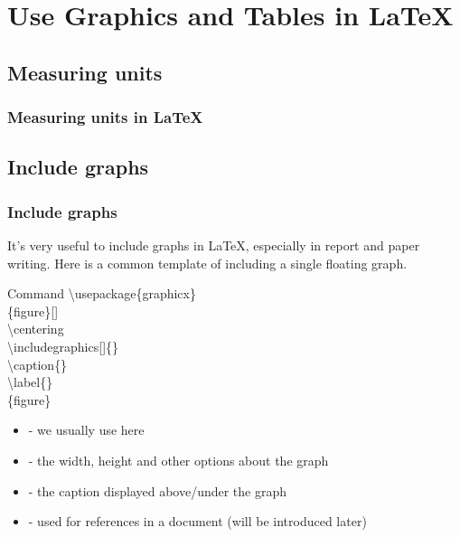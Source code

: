 \documentclass{beamer}
\newenvironment{command}{\begin{block}{Command}}{\end{block}}
\newcommand{\samplebegin}[1]{\structure{\textbackslash begin}\{#1\}}
\newcommand{\sampleend}[1]{\structure{\textbackslash end}\{#1\}}
\newcommand{\samplecommand}[1]{\alert{\textbackslash #1}}
\begin{document}
\begin{frame}
	
\end{frame}

\section{Use Graphics and Tables in \LaTeX}
\begin{frame}
\end{frame}

\subsection{Measuring units}

\begin{frame}
	\frametitle{Measuring units in \LaTeX}
\end{frame}

\subsection{Include graphs}

\begin{frame}
	\frametitle{Include graphs}
	It's very useful to include graphs in \LaTeX, especially in report and paper writing. Here is a common template of including a single floating graph.
	\begin{command}
		\samplecommand{usepackage}\{graphicx\}\\
		\samplebegin{figure}[]\\
		\qquad\samplecommand{centering}\\
		\qquad\samplecommand{includegraphics}[]\{\}\\
		\qquad\samplecommand{caption}\{\}\\
		\qquad\samplecommand{label}\{\}\\
		\sampleend{figure}
		\begin{itemize}
			\item {} - we usually use  here
			\item {} - the width, height and other options about the graph
			\item {} - the caption displayed above/under the graph
			\item {} - used for references in a document (will be introduced later)
		\end{itemize}
	\end{command}
\end{frame}
\end{document}
